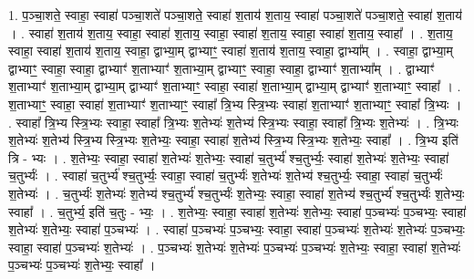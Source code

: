 \documentclass[17pt]{extarticle}
\begin{document}
1. प॒ञ्चा॒शते॒ स्वाहा॒ स्वाहा॑ पञ्चा॒शते॑ पञ्चा॒शते॒ स्वाहा॑ श॒ताय॑ श॒ताय॒ स्वाहा॑ पञ्चा॒शते॑ पञ्चा॒शते॒ स्वाहा॑ श॒ताय॑ । . स्वाहा॑ श॒ताय॑ श॒ताय॒ स्वाहा॒ स्वाहा॑ श॒ताय॒ स्वाहा॒ स्वाहा॑ श॒ताय॒ स्वाहा॒ स्वाहा॑ श॒ताय॒ स्वाहा᳚ । . श॒ताय॒ स्वाहा॒ स्वाहा॑ श॒ताय॑ श॒ताय॒ स्वाहा॒ द्वाभ्या॒म् द्वाभ्याꣳ॒॒ स्वाहा॑ श॒ताय॑ श॒ताय॒ स्वाहा॒ द्वाभ्या᳚म् । . स्वाहा॒ द्वाभ्या॒म् द्वाभ्याꣳ॒॒ स्वाहा॒ स्वाहा॒ द्वाभ्याꣳ॑ श॒ताभ्याꣳ॑ श॒ताभ्या॒म् द्वाभ्याꣳ॒॒ स्वाहा॒ स्वाहा॒ द्वाभ्याꣳ॑ श॒ताभ्या᳚म् । . द्वाभ्याꣳ॑ श॒ताभ्याꣳ॑ श॒ताभ्या॒म् द्वाभ्या॒म् द्वाभ्याꣳ॑ श॒ताभ्याꣳ॒॒ स्वाहा॒ स्वाहा॑ श॒ताभ्या॒म् द्वाभ्या॒म् द्वाभ्याꣳ॑ श॒ताभ्याꣳ॒॒ स्वाहा᳚ । . श॒ताभ्याꣳ॒॒ स्वाहा॒ स्वाहा॑ श॒ताभ्याꣳ॑ श॒ताभ्याꣳ॒॒ स्वाहा᳚ त्रि॒भ्य स्त्रि॒भ्यः स्वाहा॑ श॒ताभ्याꣳ॑ श॒ताभ्याꣳ॒॒ स्वाहा᳚ त्रि॒भ्यः । . स्वाहा᳚ त्रि॒भ्य स्त्रि॒भ्यः स्वाहा॒ स्वाहा᳚ त्रि॒भ्यः श॒तेभ्यः॑ श॒तेभ्य॑ स्त्रि॒भ्यः स्वाहा॒ स्वाहा᳚ त्रि॒भ्यः श॒तेभ्यः॑ । . त्रि॒भ्यः श॒तेभ्यः॑ श॒तेभ्य॑ स्त्रि॒भ्य स्त्रि॒भ्यः श॒तेभ्यः॒ स्वाहा॒ स्वाहा॑ श॒तेभ्य॑ स्त्रि॒भ्य स्त्रि॒भ्यः श॒तेभ्यः॒ स्वाहा᳚ । . त्रि॒भ्य इति॑ त्रि - भ्यः । . श॒तेभ्यः॒ स्वाहा॒ स्वाहा॑ श॒तेभ्यः॑ श॒तेभ्यः॒ स्वाहा॑ च॒तुर्भ्य॑ श्च॒तुर्भ्यः॒ स्वाहा॑ श॒तेभ्यः॑ श॒तेभ्यः॒ स्वाहा॑ च॒तुर्भ्यः॑ । . स्वाहा॑ च॒तुर्भ्य॑ श्च॒तुर्भ्यः॒ स्वाहा॒ स्वाहा॑ च॒तुर्भ्यः॑ श॒तेभ्यः॑ श॒तेभ्य॑ श्च॒तुर्भ्यः॒ स्वाहा॒ स्वाहा॑ च॒तुर्भ्यः॑ श॒तेभ्यः॑ । . च॒तुर्भ्यः॑ श॒तेभ्यः॑ श॒तेभ्य॑ श्च॒तुर्भ्य॑ श्च॒तुर्भ्यः॑ श॒तेभ्यः॒ स्वाहा॒ स्वाहा॑ श॒तेभ्य॑ श्च॒तुर्भ्य॑ श्च॒तुर्भ्यः॑ श॒तेभ्यः॒ स्वाहा᳚ । . च॒तुर्भ्य॒ इति॑ च॒तुः - भ्यः॒ । . श॒तेभ्यः॒ स्वाहा॒ स्वाहा॑ श॒तेभ्यः॑ श॒तेभ्यः॒ स्वाहा॑ प॒ञ्चभ्यः॑ प॒ञ्चभ्यः॒ स्वाहा॑ श॒तेभ्यः॑ श॒तेभ्यः॒ स्वाहा॑ प॒ञ्चभ्यः॑ । . स्वाहा॑ प॒ञ्चभ्यः॑ प॒ञ्चभ्यः॒ स्वाहा॒ स्वाहा॑ प॒ञ्चभ्यः॑ श॒तेभ्यः॑ श॒तेभ्यः॑ प॒ञ्चभ्यः॒ स्वाहा॒ स्वाहा॑ प॒ञ्चभ्यः॑ श॒तेभ्यः॑ । . प॒ञ्चभ्यः॑ श॒तेभ्यः॑ श॒तेभ्यः॑ प॒ञ्चभ्यः॑ प॒ञ्चभ्यः॑ श॒तेभ्यः॒ स्वाहा॒ स्वाहा॑ श॒तेभ्यः॑ प॒ञ्चभ्यः॑ प॒ञ्चभ्यः॑ श॒तेभ्यः॒ स्वाहा᳚ । \newline
\end{document}
